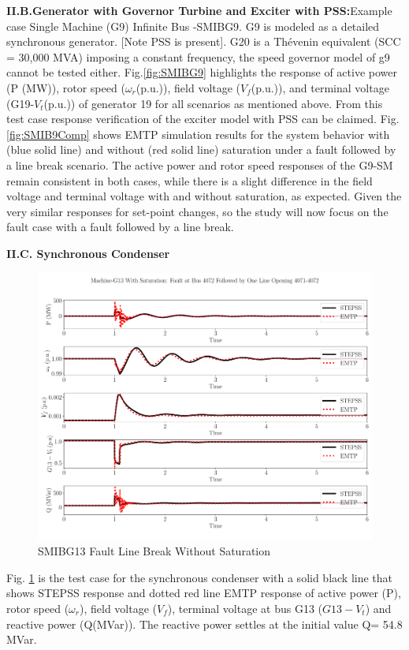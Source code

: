 \documentclass{report}
\begin{document}
\textbf{II.B.Generator with Governor Turbine and Exciter with PSS:}Example case Single Machine (G9) Infinite Bus -SMIBG9. G9 is modeled as a detailed synchronous generator. [Note PSS is present]. G20 is a Thévenin equivalent (SCC = 30,000 MVA) imposing a constant frequency, the speed governor model of g9 cannot be tested either.
Fig.\ref{fig:SMIBG9} highlights the response of active power (P (MW)), rotor speed ($\omega_r$(p.u.)), field voltage ($V_f$(p.u.)), and terminal voltage (G19-$V_t$(p.u.)) of generator 19 for all scenarios as mentioned above. From this test case response verification of the exciter model with PSS can be claimed.  
Fig. \ref{fig:SMIB9Comp} shows EMTP simulation results for the system behavior with (blue solid line) and without (red solid line) saturation under a fault followed by a line break scenario. The active power and rotor speed responses of the G9-SM remain consistent in both cases, while there is a slight difference in the field voltage and terminal voltage with and without saturation, as expected. Given the very similar responses for set-point changes, so the study will now focus on the fault case with a fault followed by a line break. 

\textbf{II.C. Synchronous Condenser}
\begin{figure}
    \centering
    \includegraphics[width=0.9\linewidth]{Figure_Nordic/Results/SMIB13/G13SatFaultLineBreak.pdf}
    \caption{SMIBG13 Fault Line Break Without Saturation}
    \label{fig:SMIB13}
\end{figure}
Fig. \ref{fig:SMIB13} is the test case for the synchronous condenser with a solid black line that shows STEPSS response and dotted red line EMTP response of active power (P), rotor speed ($\omega_r$), field voltage ($V_f$), terminal voltage at bus G13 ($G13-V_t$) and reactive power (Q(MVar)). The reactive power settles at the initial value Q=   54.8 MVar.
\end{document}

